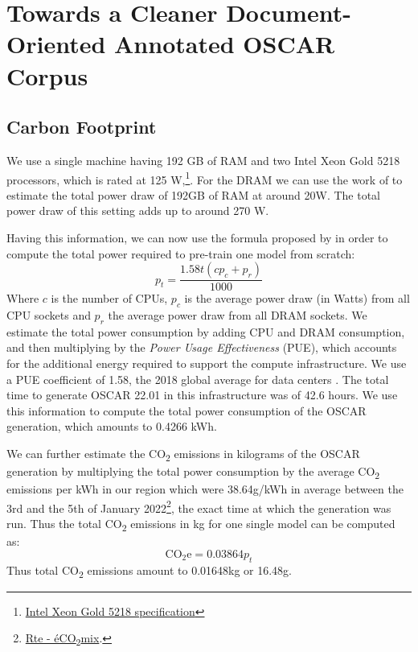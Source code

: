 \chapter{Towards a Cleaner Document-Oriented Annotated OSCAR Corpus}

\section{Carbon Footprint}\label{carbon_footprint_towards}

We use a single machine having 192 GB of RAM and two Intel Xeon Gold 5218 processors, which is rated at 125 W,\footnote{\href{https://ark.intel.com/content/www/us/en/ark/products/192444/intel-xeon-gold-5218-processor-22m-cache-2-30-ghz.html}{Intel Xeon Gold 5218 specification}}. For the DRAM we can use the work of  to estimate the total power draw of 192GB of RAM at around 20W. The total power draw of this setting adds up to around 270 W.

Having this information, we can now use the formula proposed by  in order to compute the total power required to pre-train one model from scratch:
\[
    p_t = \frac{1.58t(cp_{c} + p_r)}{1000}
\]
Where $c$ is the number of CPUs, $p_c$ is the average power draw (in Watts) from all CPU sockets and $p_r$ the average power draw from all DRAM sockets. We estimate the total power consumption by adding CPU and DRAM consumption, and then multiplying by the \emph{Power Usage Effectiveness} (PUE), which accounts for the additional energy required to support the compute infrastructure. We use a PUE coefficient of 1.58, the 2018 global average for data centers \cite{strubell-etal-2019-energy}. The total time to generate OSCAR 22.01 in this infrastructure was of 42.6 hours. We use this information to compute the total power consumption of the OSCAR generation, which amounts to 0.4266 \unit{\kWh}.

We can further estimate the CO\textsubscript{2} emissions in kilograms of the OSCAR generation by multiplying the total power consumption by the average CO\textsubscript{2} emissions per \unit{\kWh} in our region which were 38.64\unit{\gram/\kWh} in average between the 3rd and the 5th of January 2022\footnote{\href{https://www.rte-france.com/eco2mix/les-emissions-de-co2-par-kwh-produit-en-france}{Rte - éCO\textsubscript{2}mix}.}, the exact time at which the generation was run. Thus the total CO\textsubscript{2} emissions in kg for one single model can be computed as:
\[
    \text{CO}_{2}\text{e} = 0.03864 p_t
\]
Thus total CO\textsubscript{2} emissions amount to 0.01648\unit{\kilo\gram} or 16.48\unit{\gram}.

